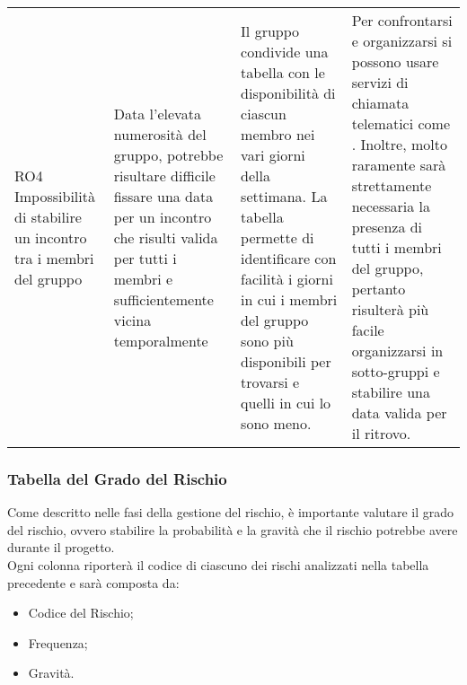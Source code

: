 {\begin{longtable}{ C{2cm} C{4cm} C{4cm} C{4.9cm}}
RO4 Impossibilità di stabilire un incontro tra i membri del gruppo & Data l'elevata numerosità del gruppo, potrebbe risultare difficile fissare una data per un incontro che risulti valida per tutti i membri e sufficientemente vicina temporalmente & Il gruppo condivide una tabella con le disponibilità di ciascun membro nei vari giorni della settimana. La tabella permette di identificare con facilità i giorni in cui i membri del gruppo sono più disponibili per trovarsi e quelli in cui lo sono meno. & Per confrontarsi e organizzarsi si possono usare servizi di chiamata telematici come . Inoltre, molto raramente sarà strettamente necessaria la presenza di tutti i membri del gruppo, pertanto risulterà più facile organizzarsi in sotto-gruppi e stabilire una data valida per il ritrovo.\\

\end{longtable}
}

\subsubsection{Tabella del Grado del Rischio}
Come descritto nelle fasi della gestione del rischio, è importante valutare il grado del rischio, ovvero stabilire la probabilità e la gravità che il rischio potrebbe avere durante il progetto.\\
Ogni colonna riporterà il codice di ciascuno dei rischi analizzati nella tabella precedente e sarà composta da:
\begin{itemize}
	\item Codice del Rischio;
	\item Frequenza;
	\item Gravità.
\end{itemize}

